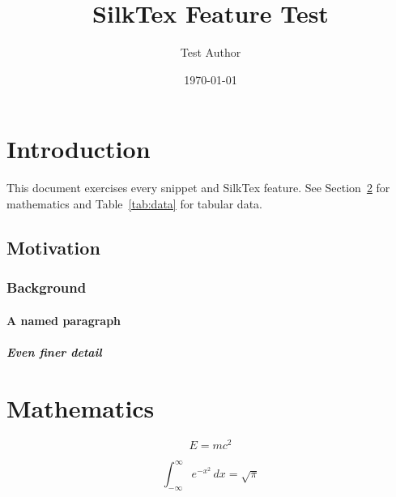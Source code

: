 \documentclass{article}
\title{SilkTex Feature Test}
\author{Test Author}
\date{\today}
\begin{document}
\maketitle
\tableofcontents
\newpage


\section{Introduction}
\label{sec:intro}

This document exercises every snippet and SilkTex feature.
See Section~\ref{sec:math} for mathematics and Table~\ref{tab:data} for tabular data.

\subsection{Motivation}
\label{sub:motivation}

\lipsum[1]

\subsubsection{Background}
\label{ssub:background}

\lipsum[2]

\paragraph{A named paragraph}
\label{par:named}

\lipsum[3]

\subparagraph{Even finer detail}
\label{subp:detail}

\lipsum[4]


\section{Mathematics}
\label{sec:math}

\begin{equation}
    E = mc^2
    \label{eq:einstein}
\end{equation}

\[
    \int_{-\infty}^{\infty} e^{-x^2}\,dx = \sqrt{\pi}
\]
\end{document}
